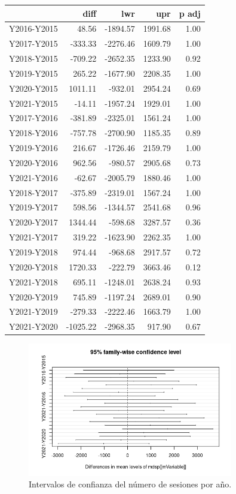 \begin{table}[ht]
\centering
\begin{tabular}{rrrrr}
  \hline
 & diff & lwr & upr & p adj \\ 
  \hline
Y2016-Y2015 & 48.56 & -1894.57 & 1991.68 & 1.00 \\ 
  Y2017-Y2015 & -333.33 & -2276.46 & 1609.79 & 1.00 \\ 
  Y2018-Y2015 & -709.22 & -2652.35 & 1233.90 & 0.92 \\ 
  Y2019-Y2015 & 265.22 & -1677.90 & 2208.35 & 1.00 \\ 
  Y2020-Y2015 & 1011.11 & -932.01 & 2954.24 & 0.69 \\ 
  Y2021-Y2015 & -14.11 & -1957.24 & 1929.01 & 1.00 \\ 
  Y2017-Y2016 & -381.89 & -2325.01 & 1561.24 & 1.00 \\ 
  Y2018-Y2016 & -757.78 & -2700.90 & 1185.35 & 0.89 \\ 
  Y2019-Y2016 & 216.67 & -1726.46 & 2159.79 & 1.00 \\ 
  Y2020-Y2016 & 962.56 & -980.57 & 2905.68 & 0.73 \\ 
  Y2021-Y2016 & -62.67 & -2005.79 & 1880.46 & 1.00 \\ 
  Y2018-Y2017 & -375.89 & -2319.01 & 1567.24 & 1.00 \\ 
  Y2019-Y2017 & 598.56 & -1344.57 & 2541.68 & 0.96 \\ 
  Y2020-Y2017 & 1344.44 & -598.68 & 3287.57 & 0.36 \\ 
  Y2021-Y2017 & 319.22 & -1623.90 & 2262.35 & 1.00 \\ 
  Y2019-Y2018 & 974.44 & -968.68 & 2917.57 & 0.72 \\ 
  Y2020-Y2018 & 1720.33 & -222.79 & 3663.46 & 0.12 \\ 
  Y2021-Y2018 & 695.11 & -1248.01 & 2638.24 & 0.93 \\ 
  Y2020-Y2019 & 745.89 & -1197.24 & 2689.01 & 0.90 \\ 
  Y2021-Y2019 & -279.33 & -2222.46 & 1663.79 & 1.00 \\ 
  Y2021-Y2020 & -1025.22 & -2968.35 & 917.90 & 0.67 \\ 
   \hline
\end{tabular}
\end{table}

\begin{figure}[H]
    \centering
    \includegraphics[width=0.80\textwidth]{imagenes/allsessions/Rplot08.png}
    \caption{Intervalos de confianza del número de sesiones por año.}
    \label{fig:confidence}
\end{figure}